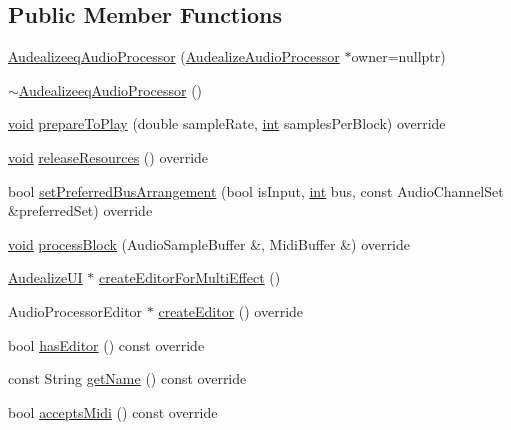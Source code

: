 \subsection*{Public Member Functions}
\begin{DoxyCompactItemize}
\item 
\hyperlink{class_audealizeeq_audio_processor_ad3f864e2039bf76b23315ee5454ef198}{Audealizeeq\+Audio\+Processor} (\hyperlink{class_audealize_1_1_audealize_audio_processor}{Audealize\+Audio\+Processor} $\ast$owner=nullptr)
\item 
\hyperlink{class_audealizeeq_audio_processor_a9a77f54b0503b3949b51ccf0a94a63ed}{$\sim$\+Audealizeeq\+Audio\+Processor} ()
\item 
\hyperlink{tk_8h_aba408b7cd755a96426e004c015f5de8e}{void} \hyperlink{class_audealizeeq_audio_processor_a4bba4adcf5b948a1e1e1d78d21432efd}{prepare\+To\+Play} (double sample\+Rate, \hyperlink{tk_8h_a83f82f76e7fed06f4c49d2db94028a6d}{int} samples\+Per\+Block) override
\item 
\hyperlink{tk_8h_aba408b7cd755a96426e004c015f5de8e}{void} \hyperlink{class_audealizeeq_audio_processor_ac002e503f882352da067e88bbdd3e994}{release\+Resources} () override
\item 
bool \hyperlink{class_audealizeeq_audio_processor_abcd1446899a51c06397970535af8cb64}{set\+Preferred\+Bus\+Arrangement} (bool is\+Input, \hyperlink{tk_8h_a83f82f76e7fed06f4c49d2db94028a6d}{int} bus, const Audio\+Channel\+Set \&preferred\+Set) override
\item 
\hyperlink{tk_8h_aba408b7cd755a96426e004c015f5de8e}{void} \hyperlink{class_audealizeeq_audio_processor_a215bf8fc1c14a5a8f586ad9463b33d0a}{process\+Block} (Audio\+Sample\+Buffer \&, Midi\+Buffer \&) override
\item 
\hyperlink{class_audealize_1_1_audealize_u_i}{Audealize\+UI} $\ast$ \hyperlink{class_audealizeeq_audio_processor_a18452a450268fa3e3cadd491525fe01c}{create\+Editor\+For\+Multi\+Effect} ()
\item 
Audio\+Processor\+Editor $\ast$ \hyperlink{class_audealizeeq_audio_processor_abb95853d018607894a95abf40ca6e308}{create\+Editor} () override
\item 
bool \hyperlink{class_audealizeeq_audio_processor_a97650263b1f2399d88f51bef0d2ad0a3}{has\+Editor} () const  override
\item 
const String \hyperlink{class_audealizeeq_audio_processor_a7f7b09545ea360ad27d2493467965891}{get\+Name} () const  override
\item 
bool \hyperlink{class_audealizeeq_audio_processor_a9e820616ada66ac1788fbaa48f1afd40}{accepts\+Midi} () const  override

\end{DoxyCompactItemize}
